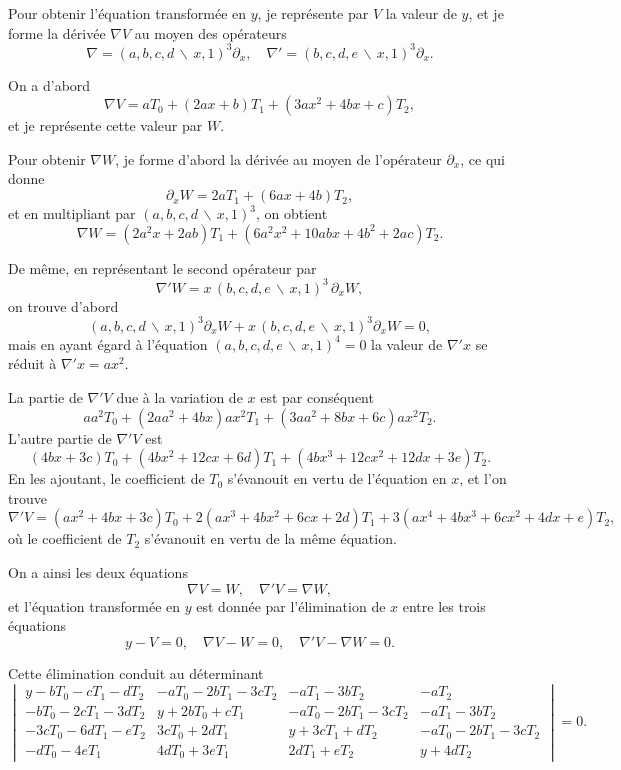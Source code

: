 \documentclass[11pt,a4paper]{book}
\begin{document}
Pour obtenir l'\'{e}quation transform\'{e}e en $y$, je repr\'{e}sente par $V$ la valeur de $y$,
et je forme la d\'{e}riv\'{e}e $\nabla V$ au moyen des op\'{e}rateurs
\[\nabla = (a,b,c,d\,\backslash\!\!\,x,1)^{3}\partial_{x},\quad
\nabla' = (b,c,d,e\,\backslash\!\!\,x,1)^{3}\partial_{x}.\]

On a d'abord
\[\nabla V = aT_{0} + (2ax+b)T_{1} + (3ax^{2}+4bx+c)T_{2},\]
et je repr\'{e}sente cette valeur par $W$.

Pour obtenir $\nabla W$, je forme d'abord la d\'{e}riv\'{e}e au moyen de l'op\'{e}rateur
$\partial_{x}$, ce qui donne
\[\partial_{x}W = 2aT_{1} + (6ax+4b)T_{2},\]
et en multipliant par $(a,b,c,d\,\backslash\!\!\,x,1)^{3}$, on obtient
\[\nabla W = (2a^{2}x+2ab)T_{1} + (6a^{2}x^{2}+10abx+4b^{2}+2ac)T_{2}.\]

De m\^{e}me, en repr\'{e}sentant le second op\'{e}rateur par
\[\nabla' W = x\,(b,c,d,e\,\backslash\!\!\,x,1)^{3}\,\partial_{x}W,\]
on trouve d'abord
\[(a,b,c,d\,\backslash\!\!\,x,1)^{3}\partial_{x}W + x\,(b,c,d,e\,\backslash\!\!\,x,1)^{3}\partial_{x}W = 0,\]
mais en ayant \'{e}gard \`{a} l'\'{e}quation $(a,b,c,d,e\,\backslash\!\!\,x,1)^{4}=0$ la valeur de
$\nabla' x$ se r\'{e}duit \`{a} $\nabla' x = ax^{2}$.

La partie de $\nabla' V$ due \`{a} la variation de $x$ est par cons\'{e}quent
\[aa^{2}T_{0} + (2aa^{2}+4bx)ax^{2}T_{1} + (3aa^{2}+8bx+6c)ax^{2}T_{2}.\]
L'autre partie de $\nabla' V$ est
\[(4bx+3c)T_{0} + (4bx^{2}+12cx+6d)T_{1} + (4bx^{3}+12cx^{2}+12dx+3e)T_{2}.\]
En les ajoutant, le coefficient de $T_{0}$ s'\'{e}vanouit en vertu de l'\'{e}quation en $x$,
et l'on trouve
\[\nabla' V = (ax^{2}+4bx+3c)T_{0} + 2(ax^{3}+4bx^{2}+6cx+2d)T_{1}
+ 3(ax^{4}+4bx^{3}+6cx^{2}+4dx+e)T_{2},\]
o\`{u} le coefficient de $T_{2}$ s'\'{e}vanouit en vertu de la m\^{e}me \'{e}quation.

On a ainsi les deux \'{e}quations
\[\nabla V = W, \quad \nabla' V = \nabla W,\]
et l'\'{e}quation transform\'{e}e en $y$ est donn\'{e}e par l'\'{e}limination de $x$ entre les
trois \'{e}quations
\[y - V = 0, \quad \nabla V - W = 0, \quad \nabla' V - \nabla W = 0.\]

Cette \'{e}limination conduit au d\'{e}terminant
\[
\begin{vmatrix}
y-bT_{0}-cT_{1}-dT_{2} & -aT_{0}-2bT_{1}-3cT_{2} & -aT_{1}-3bT_{2} & -aT_{2} \\
-bT_{0}-2cT_{1}-3dT_{2} & y+2bT_{0}+cT_{1} & -aT_{0}-2bT_{1}-3cT_{2} & -aT_{1}-3bT_{2} \\
-3cT_{0}-6dT_{1}-eT_{2} & 3cT_{0}+2dT_{1} & y+3cT_{1}+dT_{2} & -aT_{0}-2bT_{1}-3cT_{2} \\
-dT_{0}-4eT_{1} & 4dT_{0}+3eT_{1} & 2dT_{1}+eT_{2} & y+4dT_{2}
\end{vmatrix}
= 0.
\]
\end{document}
